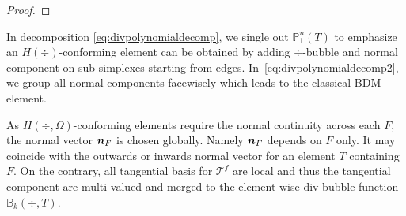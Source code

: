 \documentclass[mathpazo]{cicp}
\newcommand{\Oplus}{\ensuremath{\vcenter{\hbox{\scalebox{1.5}{$\oplus$}}}}}
\begin{document}
\begin{proof}
\end{proof}

In decomposition \eqref{eq:divpolynomialdecomp}, we single out $\mathbb P_1^n(T)$ to emphasize an $H(\div)$-conforming element can be obtained by adding $\div$-bubble and normal component on sub-simplexes starting from edges. In~\eqref{eq:divpolynomialdecomp2}, we group all normal components facewisely which leads to the classical BDM element.

As $H(\div,\Omega)$-conforming elements require the normal continuity across each $F$, the normal vector $\boldsymbol n_F$ is chosen globally. Namely $\boldsymbol n_F$ depends on $F$ only. It may coincide with the outwards or inwards normal vector for an element $T$ containing $F$. On the contrary, all tangential basis for $\mathscr T^f$ are local and thus the tangential component are multi-valued and merged to the element-wise div bubble function $\mathbb B_k(\div, T)$. 
\end{document}
